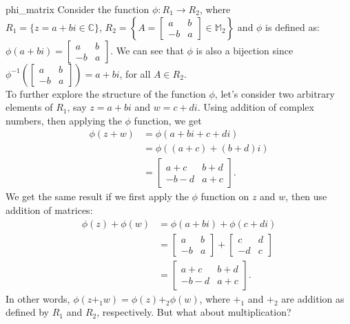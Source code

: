\begin{example}{phi_matrix}
Consider the function $\phi:R_1\rightarrow R_2$, where\\
$R_1=\{z=a+bi\in{\mathbb C}\}$, $R_2=\left\{A=
\begin{bmatrix}
a & b\\
-b & a
\end{bmatrix}\in{\mathbb M}_2\right\}$ and $\phi$ is defined as:
$\phi(a+bi)=
\begin{bmatrix}
a & b\\
-b & a
\end{bmatrix}$.
We can see that $\phi$ is also a bijection since $\phi^{-1}\left(
\begin{bmatrix}
a & b\\
-b & a
\end{bmatrix}\right)
=a+bi$, for all
$A\in R_2$.\\

To further explore the structure of the function $\phi$, let's consider two arbitrary elements of $R_1$, say $z=a+bi$ and $w=c+di$.  Using addition of complex numbers, then applying the $\phi$ function, we get
\begin{align*}
\phi(z+w)&=\phi(a+bi+c+di)\\
&=\phi((a+c)+(b+d)i)\\
&=
\begin{bmatrix}
a+c & b+d\\
-b-d & a+c
\end{bmatrix}.
\end{align*}
We get the same result if we first apply the $\phi$ function on $z$ and $w$, then use addition of matrices:
\begin{align*}
\phi(z)+\phi(w)&=\phi(a+bi)+\phi(c+di)\\
&=
\begin{bmatrix}
a & b\\
-b & a
\end{bmatrix}+
\begin{bmatrix}
c & d\\
-d & c
\end{bmatrix}\\
&=
\begin{bmatrix}
a+c & b+d\\
-b-d & a+c
\end{bmatrix}.
\end{align*}
In other words, $\phi(z+_1w)=\phi(z)+_2\phi(w)$, where $+_1$ and $+_2$ are addition as defined by $R_1$ and $R_2$, respectively.  But what about multiplication?


\end{example}
